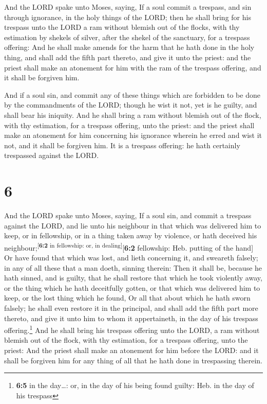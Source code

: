  And the LORD spake unto Moses, saying, 
If a soul commit a trespass, and sin through ignorance, in the holy
things of the LORD; then he shall bring for his trespass unto the LORD a
ram without blemish out of the flocks, with thy estimation by shekels of
silver, after the shekel of the sanctuary, for a trespass offering:
 And he shall make amends for the harm that he hath done
in the holy thing, and shall add the fifth part thereto, and give it
unto the priest: and the priest shall make an atonement for him with the
ram of the trespass offering, and it shall be forgiven him.

 And if a soul sin, and commit any of these things which
are forbidden to be done by the commandments of the LORD; though he wist
it not, yet is he guilty, and shall bear his iniquity. 
And he shall bring a ram without blemish out of the flock, with thy
estimation, for a trespass offering, unto the priest: and the priest
shall make an atonement for him concerning his ignorance wherein he
erred and wist it not, and it shall be forgiven him.  It
is a trespass offering: he hath certainly trespassed against the LORD.

\hypertarget{section-5}{%
\section{6}\label{section-5}}

 And the LORD spake unto Moses, saying,  If
a soul sin, and commit a trespass against the LORD, and lie unto his
neighbour in that which was delivered him to keep, or in fellowship, or
in a thing taken away by violence, or hath deceived his
neighbour;\textsuperscript{{[}\textbf{6:2} in fellowship: or, in
dealing{]}}{[}\textbf{6:2} fellowship: Heb. putting of the hand{]}
 Or have found that which was lost, and lieth concerning
it, and sweareth falsely; in any of all these that a man doeth, sinning
therein:  Then it shall be, because he hath sinned, and is
guilty, that he shall restore that which he took violently away, or the
thing which he hath deceitfully gotten, or that which was delivered him
to keep, or the lost thing which he found,  Or all that
about which he hath sworn falsely; he shall even restore it in the
principal, and shall add the fifth part more thereto, and give it unto
him to whom it appertaineth, in the day of his trespass
offering.\footnote{\textbf{6:5} in the day\ldots: or, in the day of his
  being found guilty: Heb. in the day of his trespass} 
And he shall bring his trespass offering unto the LORD, a ram without
blemish out of the flock, with thy estimation, for a trespass offering,
unto the priest:  And the priest shall make an atonement
for him before the LORD: and it shall be forgiven him for any thing of
all that he hath done in trespassing therein.

